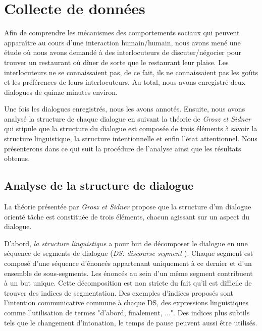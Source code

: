 \section{Collecte de données}


Afin de comprendre les mécanismes des comportements sociaux qui peuvent apparaître au cours d'une interaction humain/humain, nous avons mené une étude où nous avons demandé à des interlocuteurs de discuter/négocier pour trouver un restaurant où dîner de sorte que le restaurant leur plaise.
Les interlocuteurs ne se connaissaient pas, de ce fait, ils ne connaissaient pas les goûts et les préférences de leurs interlocuteurs. Au total, nous avons enregistré deux dialogues de quinze minutes environ.

Une fois les dialogues enregistrés, nous les avons annotés. Ensuite, nous avons analysé la structure de chaque dialogue en suivant la théorie de \emph{Grosz et Sidner} \cite{sidner1994artificial} qui stipule que la structure du dialogue est composée de trois éléments à savoir la structure linguistique, la structure intentionnelle et enfin l'état attentionnel.	
Nous présenterons dans ce qui suit la procédure de l'analyse ainsi que les résultats obtenus. 

\subsection{Analyse de la structure de dialogue}  
La théorie présentée par \emph{Grosz et Sidner} propose que la structure d'un dialogue orienté tâche est constituée de trois éléments, chacun agissant sur un aspect du dialogue. 

D'abord, \emph{la structure linguistique} a pour but de décomposer le dialogue en une séquence de segments de dialogue (\textit{DS: discourse segment }). Chaque segment est composé d'une séquence d'énoncés appartenant uniquement à ce dernier et d'un ensemble de sous-segments. Les énoncés au sein d'un même segment contribuent à un but unique. Cette décomposition est non stricte du fait qu'il est difficile de trouver des indices de segmentation. Des exemples d'indices proposés sont l'intention communicative commune à chaque DS, des expressions  linguistiques comme l'utilisation de termes "d'abord, finalement, $\ldots$". Des indices plus subtils tels que le changement d'intonation, le temps de pause peuvent aussi être utilisés.

